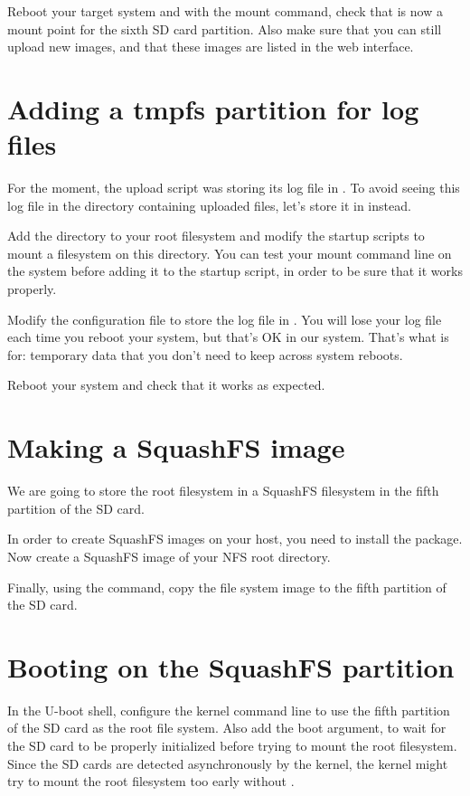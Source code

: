 Reboot your target system and with the mount command, check that
 is now a mount point for the sixth SD card
partition. Also make sure that you can still upload new images, and
that these images are listed in the web interface.

\section{Adding a tmpfs partition for log files}

For the moment, the upload script was storing its log file in
. To avoid seeing this log file in
the directory containing uploaded files, let's store it in
 instead.

Add the  directory to your root filesystem and modify
the startup scripts to mount a  filesystem on this
directory. You can test your  mount command line on the
system before adding it to the startup script, in order to be sure
that it works properly.

Modify the  configuration file to store
the log file in . You will lose your log
file each time you reboot your system, but that's OK in our
system. That's what  is for: temporary data that you don't need
to keep across system reboots.

Reboot your system and check that it works as expected.

\section{Making a SquashFS image}

We are going to store the root filesystem in a SquashFS filesystem in
the fifth partition of the SD card.

In order to create SquashFS images on your host, you need to install
the  package. Now create a SquashFS image of your
NFS root directory.

Finally, using the  command, copy the file system image to
the fifth partition of the SD card.

\section{Booting on the SquashFS partition}

In the U-boot shell, configure the kernel command line to use the
fifth partition of the SD card as the root file system. Also add the
 boot argument, to wait for the SD card to be properly
initialized before trying to mount the root filesystem. Since the SD
cards are detected asynchronously by the kernel, the kernel might try
to mount the root filesystem too early without .

